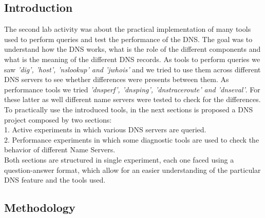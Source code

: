 \documentclass[a4paper,10pt]{article}
\begin{document}
\begin{multicols}{2}
\subsection{Introduction}
The second lab activity was about the practical implementation of many tools used to perform queries and test the performance of the DNS.
The goal was to understand how the DNS works, what is the role of the different components and what is the meaning of the different DNS records.
As tools to perform queries we saw \textit{'dig', 'host', 'nslookup' and 'jwhois'} and we tried to use them across different DNS servers to see
whether differences were presents between them. As performance tools we tried \textit{'dnsperf', 'dnsping', 'dnstraceroute' and 'dnseval'}. For these latter
as well different name servers were tested to check for the differences.\\
To practically use the introduced tools, in the next sections is proposed a DNS project composed by two sections:\\
1. Active experiments in which various DNS servers are queried.\\
2. Performance experiments in which some diagnostic tools are used to check the behavior of different Name Servers.\\ 
Both sections are structured in single experiment, each one faced using a 
question-answer format, which allow for an easier understanding of the particular DNS feature and the tools used.




\subsection{Methodology}


\end{multicols}
\end{document}
